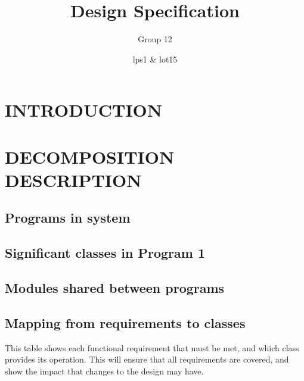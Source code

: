 \documentclass{project}
\begin{document}
\title{Design Specification}
\subtitle{Group 12}

    \author{lps1 \& lot15}     
    \maketitle

\tableofcontents

\section{INTRODUCTION}

\section{DECOMPOSITION DESCRIPTION}
    \subsection{Programs in system}
    \subsection{Significant classes in Program 1}
    \subsection{Modules shared between programs}
    \subsection{Mapping from requirements to classes}

        This table shows each functional requirement that must be met, and
        which class provides its operation. This will ensure that all
        requirements are covered, and show the impact that changes to the
        design may have.
\end{document}

